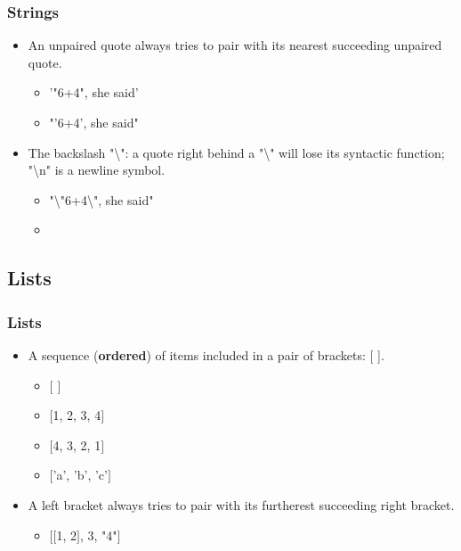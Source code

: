 \documentclass[xcolor={usenames, dvipsnames}, hyperref={colorlinks,linkcolor=black, urlcolor=blue}]{beamer}
\begin{document}


\begin{frame}
\frametitle{Strings}

\begin{itemize}
\item An unpaired quote always tries to pair with its nearest succeeding unpaired quote.
	\begin{itemize}
	\item '"6+4", she said'
	\item "'6+4', she said"
	\end{itemize}
\end{itemize}

\begin{itemize}
\item The backslash "\textbackslash": a quote right behind a "\textbackslash" will lose its syntactic function; "{\textbackslash}n" is a newline symbol.
	\begin{itemize}
	\item "{\color{red}\textbackslash"}6+4{\color{red}\textbackslash"}, she said"
	\item {}
	\end{itemize}
\end{itemize}

\end{frame}


\subsection{Lists}
\begin{frame}
\frametitle{Lists}

\begin{itemize}
\item A sequence (\textbf{ordered}) of items included in a pair of brackets: [ ].
	\begin{itemize}
	\item $[$ $]$
	\item $[$1, 2, 3, 4$]$
	\item $[$4, 3, 2, 1$]$
	\item $[$'a', 'b', 'c'$]$
	\end{itemize}
\end{itemize}

\begin{itemize}
\item A left bracket always tries to pair with its furtherest succeeding right bracket.
	\begin{itemize}
	\item $[$$[$1, 2$]$, 3, "4"$]$
	\end{itemize}
\end{itemize}

\end{frame}
\end{document}
